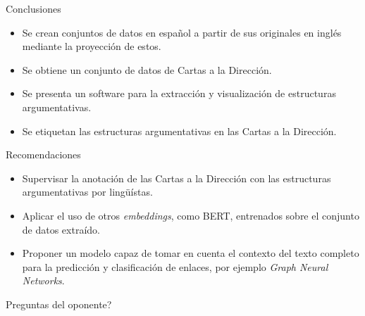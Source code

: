 \documentclass{beamer}
\begin{document}
\begin{frame}{Conclusiones}
    \begin{itemize}
        \item Se crean conjuntos de datos en español a partir de sus originales en inglés mediante la proyección de estos.
        \pause
        \item Se obtiene un conjunto de datos de Cartas a la Dirección.
        \pause
        \item Se presenta un software para la extracción y visualización de estructuras argumentativas.
        \pause
        \item Se etiquetan las estructuras argumentativas en las Cartas a la Dirección.
    \end{itemize}
\end{frame}

\begin{frame}{Recomendaciones}
    \begin{itemize}
        \item<1-> Supervisar la anotación de las Cartas a la Dirección con las estructuras argumentativas por lingüístas.
        \item<2-> Aplicar el uso de otros \textit{embeddings}, como BERT, entrenados sobre el conjunto 
        de datos extraído.
        \item<3-> Proponer un modelo capaz de tomar en cuenta el contexto del texto completo para la
        predicción y clasificación de enlaces, por ejemplo \textit{Graph Neural Networks}.
    \end{itemize}    
\end{frame}

\begin{frame}
    \titlepage 
\end{frame}
\logo{}

\begin{frame}{Preguntas del oponente?}
    
\end{frame}
\end{document}
